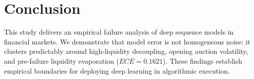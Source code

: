 \documentclass[10pt,twocolumn,letterpaper]{article}
\begin{document}
\section{Conclusion}
This study delivers an empirical failure analysis of deep sequence models in financial markets. We demonstrate that model error is not homogeneous noise: it clusters predictably around high-liquidity decoupling, opening auction volatility, and pre-failure liquidity evaporation ($ECE = 0.1621$). These findings establish empirical boundaries for deploying deep learning in algorithmic execution.



\end{document}

